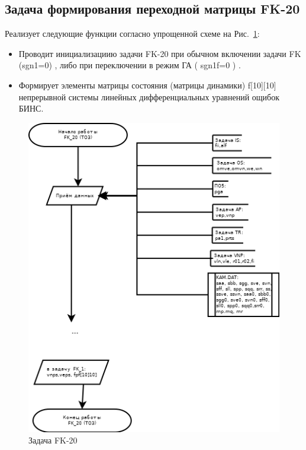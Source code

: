 \subsection{Задача формирования переходной матрицы FK-20}
Реализует следующие функции согласно упрощенной схеме на Рис.~\ref{fig:FK-20}:
\begin{itemize}
\item Проводит инициализациию задачи FK-20 при обычном включении задачи FK (sgn1=0) , либо при  переключении в режим ГА ( sgn1f=0 ) .
\item Формирует элементы  матрицы состояния (матрицы динамики) f[10][10]  непрерывной системы  линейных дифференциальных уравнений ощибок  БИНС.
\end{itemize}
\begin{figure}[H]
    \centering
    \includegraphics[width=0.75\linewidth]{images/FK_20_simple.png}
    \caption{Задача FK-20}
    \label{fig:FK-20}
\end{figure}
